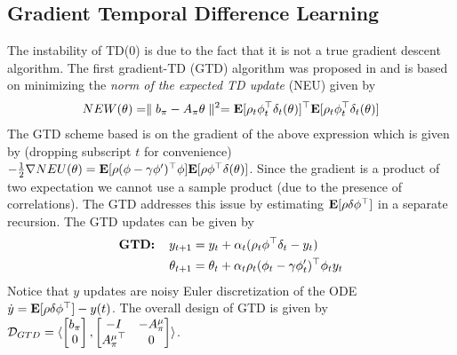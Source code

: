 \subsection{Gradient Temporal Difference Learning}
The instability of TD($0$) is due to the fact that it is not a true gradient descent algorithm. The first gradient-TD (GTD) algorithm was proposed in \cite{} and is based on minimizing the \emph{norm of the expected TD update} (NEU) given by
\begin{align}\label{neu}
NEW(\theta)=\parallel b_\pi -A_\pi\theta\parallel^2
=\mathbf{E}[\rho_t\phi_t^\top\delta_t(\theta)]^\top\mathbf{E}[\rho_t\phi_t^\top\delta_t(\theta)]
\end{align}
The GTD scheme based is on the gradient of the above expression which is given by (dropping subscript $t$ for convenience) $-\frac{1}{2}\nabla NEU(\theta)=\mathbf{E}[\rho (\phi-\gamma\phi')^\top \phi]\mathbf{E}[\rho \phi^\top\delta(\theta)]$. Since the gradient is a product of two expectation we cannot use a sample product (due to the presence of correlations). The GTD addresses this issue by estimating $\mathbf{E}[\rho\delta\phi^\top]$ in a separate recursion. The GTD updates can be given by
\begin{align}
\begin{split}
\textbf{GTD:\quad}y_{t+1}&=y_t+\alpha_t(\rho_t\phi^\top\delta_t -y_t)\\
\theta_{t+1}&=\theta_t+\alpha_t\rho_t(\phi_t-\gamma\phi'_t)^\top\phi_ty_t
\end{split}
\end{align}
Notice that $y$ updates are noisy Euler discretization of the ODE $\dot{y}=\mathbf{E}[\rho\delta\phi^\top]-y(t)$. The overall design of GTD is given by $\mathcal{D}_{GTD}=\langle \begin{bmatrix}b_\pi\\ 0\\ \end{bmatrix},\begin{bmatrix}-I &-A^\mu_\pi \\ {A^\mu_\pi}^\top &0 \\ \end{bmatrix}\rangle$.\par
